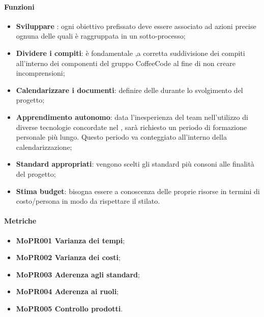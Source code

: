 \documentclass[../piano-di-qualifica.tex]{subfiles}
\begin{document}
\paragraph{Funzioni}
\label{sub:funzioni_1}

\begin{itemize}
    \item \textbf{Sviluppare }: ogni obiettivo prefissato deve essere associato ad azioni precise ognuna delle quali è raggruppata in un sotto-processo;
    \item \textbf{Dividere i compiti}: è fondamentale ,a corretta suddivisione dei compiti all'interno dei componenti del gruppo CoffeeCode al fine di non creare incomprensioni;
    \item \textbf{Calendarizzare i documenti}: definire delle  durante lo svolgimento del progetto;
    \item \textbf{Apprendimento autonomo}: data l'inesperienza del team nell'utilizzo di diverse tecnologie concordate nel , sarà richiesto un periodo di formazione personale più lungo. Questo periodo va conteggiato all'interno della calendarizzazione;
    \item \textbf{Standard appropriati}: vengono scelti gli standard più consoni alle finalità del progetto;
    \item \textbf{Stima budget}: bisogna essere a conoscenza delle proprie risorse in termini di costo/persona in modo da rispettare il  stilato.
\end{itemize}

\paragraph{Metriche}
\label{sub:metriche_1}
\begin{itemize}
    \item \textbf{MoPR001 Varianza dei tempi};
    \item \textbf{MoPR002 Varianza dei costi};
    \item \textbf{MoPR003 Aderenza agli standard};
    \item \textbf{MoPR004 Aderenza ai ruoli};
    \item \textbf{MoPR005 Controllo prodotti}.
\end{itemize}
\end{document}
